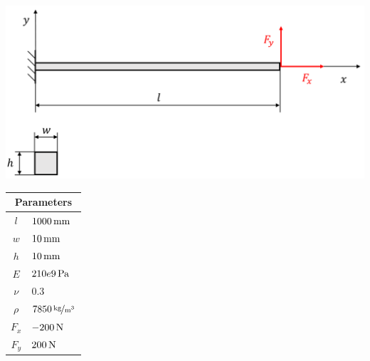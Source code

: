 \begin{minipage}{\textwidth}
	\begin{minipage}[b]{0.7\textwidth}
		\centering
		\includegraphics[width=\textwidth]{figures/verification/reference-beam-1}
	\end{minipage}
	\hfill
	\begin{minipage}[b]{0.29\textwidth}
		\centering
		\begin{tabular}{|cl|}
			\hline
			\multicolumn{2}{|c|}{Parameters} \\
			\hline
			$l$ & $\unit[1000]{mm}$ \\
			$w$ & $\unit[10]{mm}$ \\
			$h$ & $\unit[10]{mm}$ \\
			$E$ & $\unit[210e9]{Pa}$ \\
			$\nu$ & $0.3$ \\
			$\rho$ & $\unitfrac[7850]{kg}{m^3}$ \\
			$F_x$ & $\unit[-200]{N}$ \\
			$F_y$ & $\unit[200]{N}$ \\
			\hline
		\end{tabular}
	\end{minipage}
\end{minipage}

